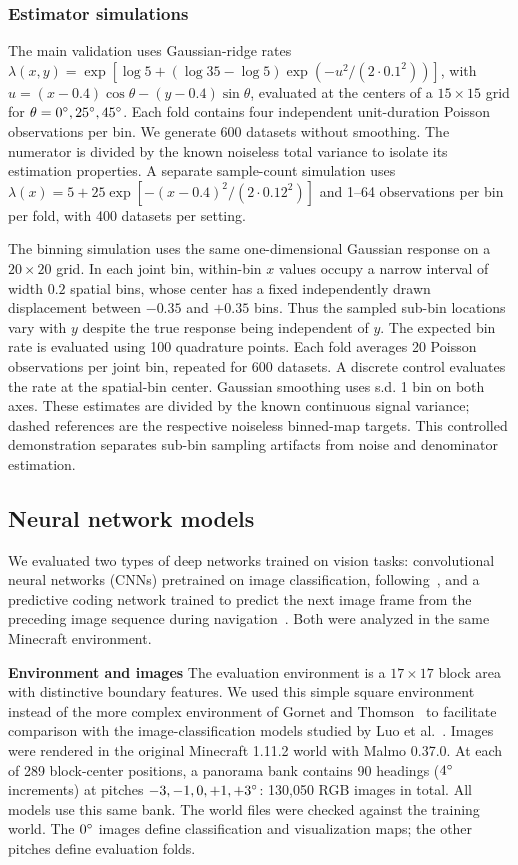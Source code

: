 \documentclass[11pt]{article}
\begin{document}
\subsubsection*{Estimator simulations}
The main validation uses Gaussian-ridge rates $\lambda(x,y)=\exp[\log5+(\log35-\log5)\exp(-u^2/(2\cdot0.1^2))]$, with $u=(x-0.4)\cos\theta-(y-0.4)\sin\theta$, evaluated at the centers of a $15\times15$ grid for $\theta=0\degree,25\degree,45\degree$. Each fold contains four independent unit-duration Poisson observations per bin. We generate 600 datasets without smoothing. The numerator is divided by the known noiseless total variance to isolate its estimation properties. A separate sample-count simulation uses $\lambda(x)=5+25\exp[-(x-0.4)^2/(2\cdot0.12^2)]$ and 1--64 observations per bin per fold, with 400 datasets per setting.

The binning simulation uses the same one-dimensional Gaussian response on a $20\times20$ grid. In each joint bin, within-bin $x$ values occupy a narrow interval of width $0.2$ spatial bins, whose center has a fixed independently drawn displacement between $-0.35$ and $+0.35$ bins. Thus the sampled sub-bin locations vary with $y$ despite the true response being independent of $y$. The expected bin rate is evaluated using 100 quadrature points. Each fold averages 20 Poisson observations per joint bin, repeated for 600 datasets. A discrete control evaluates the rate at the spatial-bin center. Gaussian smoothing uses s.d. 1 bin on both axes. These estimates are divided by the known continuous signal variance; dashed references are the respective noiseless binned-map targets. This controlled demonstration separates sub-bin sampling artifacts from noise and denominator estimation.

\subsection{Neural network models}

We evaluated two types of deep networks trained on vision tasks: convolutional neural networks (CNNs) pretrained on image classification, following~\cite{Luo2024}, and a predictive coding network trained to predict the next image frame from the preceding image sequence during navigation~\cite{Gornet2024automated}. Both were analyzed in the same Minecraft environment.

{\bf Environment and images}
The evaluation environment is a $17\times17$ block area with distinctive boundary features. We used this simple square environment instead of the more complex environment of Gornet and Thomson~\cite{Gornet2024automated} to facilitate comparison with the image-classification models studied by Luo et al.~\cite{Luo2024}. Images were rendered in the original Minecraft 1.11.2 world with Malmo 0.37.0. At each of 289 block-center positions, a panorama bank contains 90 headings ($4\degree$ increments) at pitches $-3,-1,0,+1,+3\degree$: 130{,}050 RGB images in total. All models use this same bank. The world files were checked against the training world. The $0\degree$ images define classification and visualization maps; the other pitches define evaluation folds.
\end{document}
